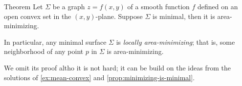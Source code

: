 \begin{thm}{Theorem}
Let $\Sigma$ be a graph $z=f(x,y)$ of a smooth function $f$ defined on an open convex set in the $(x,y)$-plane.
Suppose $\Sigma$ is minimal, then it is area-minimizing.

In particular, any minimal surface $\Sigma$ is \emph{locally area-minimizing};
that is, some neighborhood of any point $p$ in $\Sigma$ is area-minimizing.
\end{thm}

We omit its proof altho it is not hard;
it can be build on the ideas from the solutions of \ref{ex:mean-convex} and \ref{prop:minimizing-is-minimal}.

